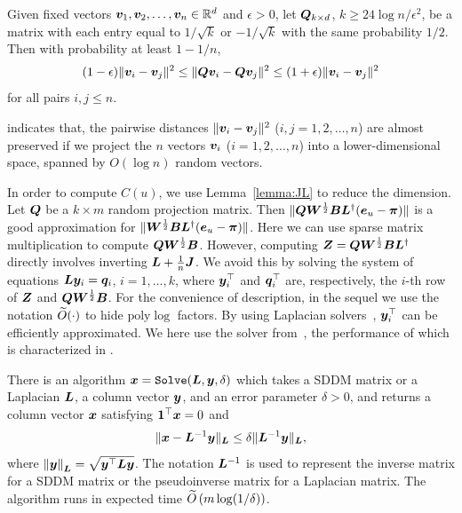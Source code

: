 \documentclass[10pt,journal,compsoc,twocolumn,twoside]{IEEEtran}
\begin{document}
\begin{lemma}
    \label{lemma:JL}
    Given fixed vectors \(\boldsymbol{v}_1,\boldsymbol{v}_2,\ldots,\boldsymbol{v}_n\in \mathbb{R}^d\) and
    \(\epsilon>0\), let
    \(\boldsymbol{Q}_{k\times d}\),  \(k\ge 24\log n/\epsilon^2\), be a matrix with each  entry equal  to \(1/\sqrt{k}\) or \(- 1/\sqrt{k}\)  with the same probability \(1/2\). Then with probability at least \(1-1/n\),
    \[(1-\epsilon)\|\boldsymbol{v}_i-\boldsymbol{v}_j\|^2\le \|\boldsymbol{Q} \boldsymbol{v}_i-\boldsymbol{Q} \boldsymbol{v}_j\|^2\le
        (1+\epsilon)\|\boldsymbol{v}_i-\boldsymbol{v}_j\|^2\] for all pairs \(i,j\le n\).
\end{lemma}
 indicates that,  the pairwise distances \(\|\boldsymbol{v}_i-\boldsymbol{v}_j\|^2\) (\(i,j=1,2,\ldots, n\)) are almost preserved if we project the \(n\) vectors \(\boldsymbol{v}_i\) (\(i=1,2,\ldots, n\))  into a lower-dimensional space, spanned
by \(O(\log n)\) random vectors.

In order to compute  \(C(u)\), we use Lemma~\ref{lemma:JL} to reduce the dimension. Let \(\boldsymbol{Q}\) be a \(k\times m\) random projection matrix. Then  \(\|\boldsymbol{Q} \boldsymbol{W}^{\frac{1}{2}} \boldsymbol{B} \boldsymbol{L}^{\dagger}(\boldsymbol{e}_u-\boldsymbol{\pi})\|\) is a good approximation for \(\|\boldsymbol{W}^{\frac{1}{2}} \boldsymbol{B} \boldsymbol{L}^{\dagger} (\boldsymbol{e}_u - \boldsymbol{\pi})\|\). Here we can use sparse matrix multiplication to compute \(\boldsymbol{Q} \boldsymbol{W}^{\frac{1}{2}} \boldsymbol{B}\). However, computing \(\boldsymbol{Z}=\boldsymbol{Q} \boldsymbol{W}^{\frac{1}{2}} \boldsymbol{B} \boldsymbol{L}^{\dagger}\) directly involves inverting \(\boldsymbol{L}+\frac{1}{n}\boldsymbol{J}\). We avoid this by solving the system of equations \(\boldsymbol{L} \boldsymbol{y}_i=\boldsymbol{q}_i\), \(i=1,\ldots,k\), where  \(\boldsymbol{y}^\top_i\) and \(\boldsymbol{q}^\top_i\) are, respectively, the \(i\)-th row of \(\boldsymbol{Z}\) and \(\boldsymbol{Q} \boldsymbol{W}^{\frac{1}{2}} \boldsymbol{B}\). For the convenience  of description, in the sequel we use the notation \(\widetilde{O}(\cdot)\) to hide \(\mathrm{poly} \log \) factors. By using Laplacian solvers~\cite{SpTe04,Sp10,KoMiPe11,LiBr12,CoKyMiPaPeRaSu14,KySa16}, \(\boldsymbol{y}^\top _i\) can be efficiently approximated.  We here use the  solver from~\cite{CoKyMiPaPeRaSu14}, the performance of which is characterized in .

\begin{lemma}
    \label{lemma:ST}
    There is an algorithm \(\boldsymbol{x} = \mathtt{Solve}(\boldsymbol{L},\boldsymbol{y},\delta)\) which
    takes a SDDM matrix or a Laplacian \(\boldsymbol{L}\),
    a column vector \(\boldsymbol{y}\), and an error
    parameter \(\delta > 0\), and returns a column vector \(\boldsymbol{x}\) satisfying  \(\boldsymbol{1}^\top\boldsymbol{x} = 0\) and
    \[
        \|\boldsymbol{x} - \boldsymbol{L}^{-1} \boldsymbol{y}\|_{\boldsymbol{L}} \leq \delta \|\boldsymbol{L}^{-1} \boldsymbol{y}\|_{\boldsymbol{L}},
    \]
    where \(\left\Vert\boldsymbol{y}\right\Vert_{\boldsymbol{L}} = \sqrt{\boldsymbol{y}^{\top} \boldsymbol{L} \boldsymbol{y}}\).
    The notation \(\boldsymbol{L}^{-1}\) is used to represent the inverse matrix for a SDDM matrix or the pseudoinverse matrix for a Laplacian matrix.
    The algorithm runs in expected time \(\widetilde{O} \left(m \log(1/\delta) \right)\).
\end{lemma}
\end{document}
